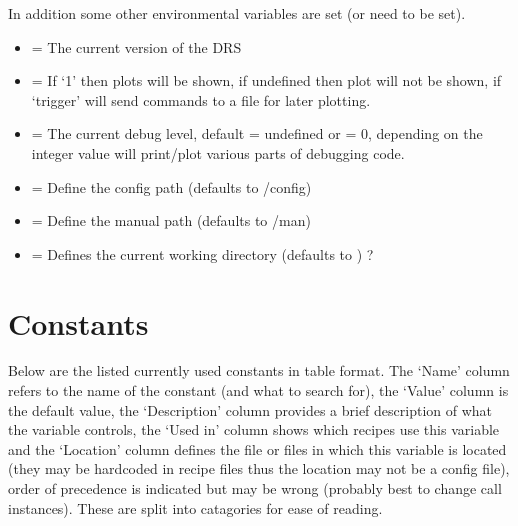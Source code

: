 In addition some other environmental variables are set (or need to be set).
\begin{itemize}
	\item {} = The current version of the DRS
	\item {} = If `1' then plots will be shown, if undefined then plot will not be shown, if `trigger' will send commands to a file for later plotting.
	\item {} = The current debug level, default = undefined or = 0, depending on the integer value will print/plot various parts of debugging code.
	\item {} = Define the config path (defaults to /config)
	\item {} = Define the manual path (defaults to /man)
	\item {} = Defines the current working directory (defaults to ) ?
\end{itemize} 

\section{Constants}
\label{section:the_constants}




%
%


Below are the listed currently used constants in table format. The `Name' column refers to the name of the constant (and what to search for), the `Value' column is the default value, the `Description' column provides a brief description of what the variable controls, the `Used in' column shows which recipes use this variable and the `Location' column defines the file or files in which this variable is located (they may be hardcoded in recipe files thus the location may not be a config file), order of precedence is indicated but may be wrong (probably best to change call instances). These are split into catagories for ease of reading. \\

